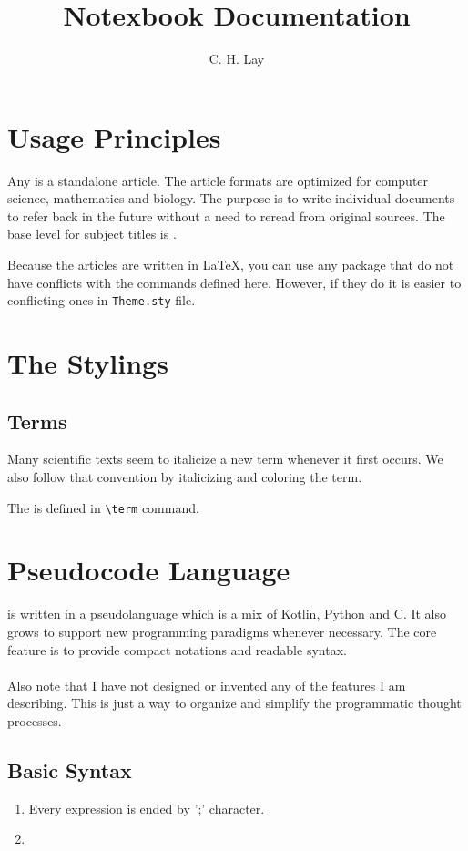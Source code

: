 \documentclass{book}
\title{Notexbook Documentation}
\author{C. H. Lay}
\begin{document}
\maketitle
\tableofcontents

\chapter{Usage Principles}
Any  is a standalone article.
The article formats are optimized for computer science, mathematics and biology.
The purpose is to write individual documents to refer back in the future without
a need to reread from original sources. The base level for subject titles is .

Because the articles are written in \LaTeX, you can use any package 
that do not have conflicts with the commands defined here.
However, if they do it is easier to conflicting ones in \verb|Theme.sty| file.

\chapter{The Stylings}
\section{Terms}
Many scientific texts seem to italicize a new term whenever it first occurs.
We also follow that convention by italicizing and coloring the term.

\begin{example}
The  is defined in \verb|\term| command.
\end{example}

\chapter{Pseudocode Language}
 is written in a pseudolanguage which is a mix of Kotlin, Python and C.
It also grows to support new programming paradigms whenever necessary.
The core feature is to provide compact notations and readable syntax.
\\\\
\noindent
Also note that I have not designed or invented any of the features I am describing.
This is just a way to organize and simplify the programmatic thought processes.

\section{Basic Syntax}
\begin{enumerate}
    \item Every expression is ended by ';' character.
    \item 
\end{enumerate}
\end{document}

